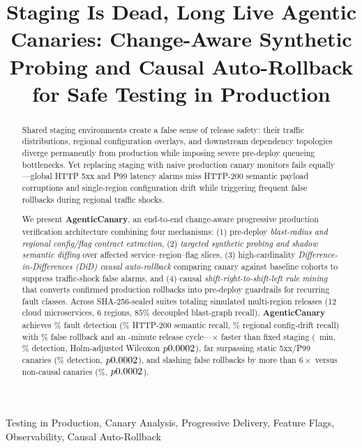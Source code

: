 \documentclass[conference]{IEEEtran}
\begin{document}
\title{Staging Is Dead, Long Live Agentic Canaries: Change-Aware Synthetic Probing and Causal Auto-Rollback for Safe Testing in Production}

\author{
}

\maketitle

\begin{abstract}
Shared staging environments create a false sense of release safety: their traffic distributions, regional configuration overlays, and downstream dependency topologies diverge permanently from production while imposing severe pre-deploy queueing bottlenecks. Yet replacing staging with naive production canary monitors fails equally---global HTTP 5xx and P99 latency alarms miss HTTP-200 semantic payload corruptions and single-region configuration drift while triggering frequent false rollbacks during regional traffic shocks.

We present \textbf{AgenticCanary}, an end-to-end change-aware progressive production verification architecture combining four mechanisms: (1) pre-deploy \emph{blast-radius and regional config/flag contract extraction}, (2) \emph{targeted synthetic probing and shadow semantic diffing} over affected service--region--flag slices, (3) high-cardinality \emph{Difference-in-Differences (DiD) causal auto-rollback} comparing canary against baseline cohorts to suppress traffic-shock false alarms, and (4) causal \emph{shift-right-to-shift-left rule mining} that converts confirmed production rollbacks into pre-deploy guardrails for recurring fault classes. Across \TotalSealedRuns{} SHA-256-sealed suites totaling \TotalSimReleases{} simulated multi-region releases (12 cloud microservices, 6 regions, $85\%$ decoupled blast-graph recall), \textbf{AgenticCanary} achieves \ACDetPct{}\% fault detection (\ACSemPct{}\% HTTP-200 semantic recall, \ACDriftPct{}\% regional config-drift recall) with \ACFalseRollPct{}\% false rollback and an \ACCycleMin{}-minute release cycle---\CycleSpeedupVsStaging{}$\times$ faster than fixed staging (\StagingCycleMin{}~min, \StagingDetPct{}\% detection, Holm-adjusted Wilcoxon $p0.0002{}$), far surpassing static 5xx/P99 canaries (\StaticCanaryDetPct{}\% detection, $p0.0002{}$), and slashing false rollbacks by more than $6\times$ versus non-causal canaries (\NoCausalFalseRollPct{}\%, $p0.0002{}$).
\end{abstract}

\begin{IEEEkeywords}
Testing in Production, Canary Analysis, Progressive Delivery, Feature Flags, Observability, Causal Auto-Rollback
\end{IEEEkeywords}










\end{document}

